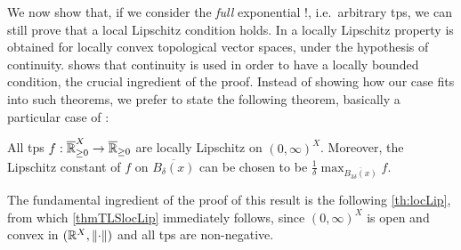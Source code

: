 We now show that, if we consider the \emph{full} exponential $!$, i.e.~arbitrary tps, we can still prove that a local Lipschitz condition holds. %
In \cite[Theorem 6.4]{Cobzas2017} a locally Lipschitz property is obtained for locally convex topological vector spaces, under the hypothesis of continuity. \cite[Proposition 6.5]{Cobzas2017} shows that continuity is used in order to have a locally bounded condition, the crucial ingredient of the proof.
Instead of showing how our case fits into such theorems, we prefer to state the following theorem, basically a particular case of \cite[Theorem 6.9, Lemma 6.10]{Cobzas2017}:

\begin{theorem}\label{thmTLSlocLip}
All tps $f:\overline{\mathbb{R}}_{\geq 0}^X\to\overline{\mathbb{R}}_{\geq 0}$ are locally Lipschitz on $(0,\infty)^X$.
Moreover, the Lipschitz constant of $f$ on $\overline{B_{\delta}(x)}$ can be chosen to be $\frac{1}{\delta}\max_{\overline{B_{3\delta}(x)}} f$.
\end{theorem}
The fundamental ingredient of the proof of this result is the following \autoref{th:locLip}, from which \autoref{thmTLSlocLip} immediately follows, since $(0,\infty)^X$ is open and convex in $(\mathbb{R}^X,\lVert\cdot\rVert)$ and all tps are non-negative.

